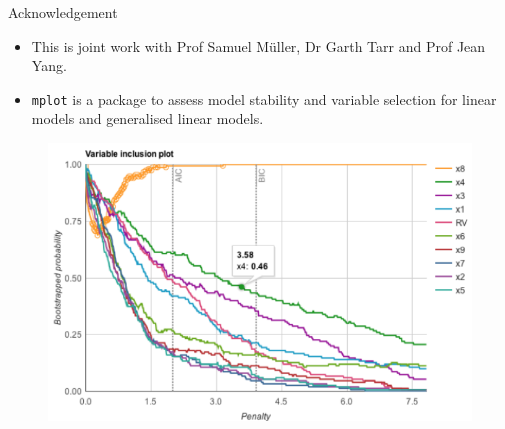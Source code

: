 \documentclass[12pt,aspectratio=169]{beamer}
\begin{document}
\begin{frame}{Acknowledgement}
\begin{itemize}
	\item This is joint work with Prof Samuel M\"{u}ller, Dr Garth Tarr and Prof Jean Yang.
	\item \texttt{mplot} \cite{Tarr2018} is a package to assess model stability and variable selection for linear models and generalised linear models.
\end{itemize}
\begin{figure}
	\centering
	\includegraphics[width=0.55\linewidth]{mplot_ad}
	\label{fig:mplotad}
\end{figure}
\end{frame}
\end{document}

